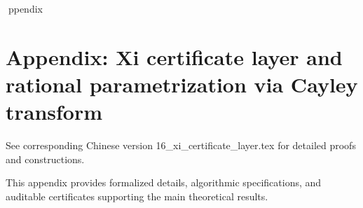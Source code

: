 ppendix

\section*{Appendix: Xi certificate layer and rational parametrization via Cayley transform}

See corresponding Chinese version 16_xi_certificate_layer.tex for detailed proofs and constructions.

This appendix provides formalized details, algorithmic specifications, and auditable certificates supporting the main theoretical results.
